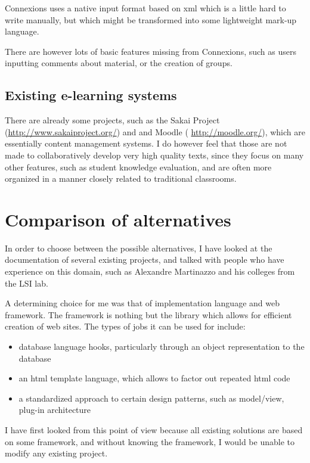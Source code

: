\documentclass[12pt]{article}
\begin{document}
Connexions uses a native input format based on xml which is a little hard to write manually, but which might be transformed into some lightweight mark-up language.

There are however lots of basic features missing from Connexions, such as users inputting comments about material, or the creation of groups.

\subsection{Existing e-learning systems} \label{sec-learning-websites}

There are already some projects, such as the Sakai Project (\url{http://www.sakaiproject.org/}) and and Moodle (
\url{http://moodle.org/}), which are essentially content management systems. I do however feel that those are not made to collaboratively develop very high quality texts, since they focus on many other features, such as student knowledge evaluation, and are often more organized in a manner closely related to traditional classrooms.

\section{Comparison of alternatives}

In order to choose between the possible alternatives, I have looked at the documentation of several existing projects, and talked with people who have experience on this domain, such as Alexandre Martinazzo and his colleges from the LSI lab.

A determining choice for me was that of implementation language and web framework. The framework is nothing but the library which allows for efficient creation of web sites. The types of jobs it can be used for include:

\begin{itemize}
  \item database language hooks, particularly through an object representation to the database
  \item an html template language, which allows to factor out repeated html code
  \item a standardized approach to certain design patterns, such as model/view, plug-in architecture
\end{itemize}

I have first looked from this point of view because all existing solutions are based on some framework,
and without knowing the framework, I would be unable to modify any existing project.
\end{document}
